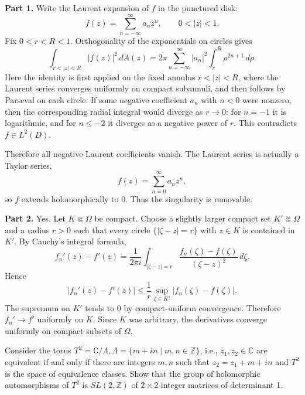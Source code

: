 \begin{solution}
\textbf{Part 1.}
Write the Laurent expansion of $f$ in the punctured disk:
\[
f(z)=\sum_{n=-\infty}^{\infty}a_n z^n,\qquad 0<|z|<1.
\]
Fix $0<r<R<1$. Orthogonality of the exponentials on circles gives
\[
\int_{r<|z|<R}|f(z)|^2\,dA(z)
=2\pi\sum_{n=-\infty}^{\infty}|a_n|^2
\int_r^R \rho^{2n+1}\,d\rho.
\]
Here the identity is first applied on the fixed annulus $r<|z|<R$, where the Laurent series converges uniformly on compact subannuli, and then follows by Parseval on each circle. If some negative coefficient $a_n$ with $n<0$ were nonzero, then the corresponding radial integral would diverge as $r\to 0$: for $n=-1$ it is logarithmic, and for $n\leq -2$ it diverges as a negative power of $r$. This contradicts $f\in L^2(D)$.

Therefore all negative Laurent coefficients vanish. The Laurent series is actually a Taylor series,
\[
f(z)=\sum_{n=0}^{\infty}a_n z^n,
\]
so $f$ extends holomorphically to $0$. Thus the singularity is removable.

\textbf{Part 2.}
Yes. Let $K\Subset\Omega$ be compact. Choose a slightly larger compact set $K'\Subset\Omega$ and a radius $r>0$ such that every circle $\{|\zeta-z|=r\}$ with $z\in K$ is contained in $K'$. By Cauchy's integral formula,
\[
f_n'(z)-f'(z)
=\frac{1}{2\pi i}\int_{|\zeta-z|=r}
\frac{f_n(\zeta)-f(\zeta)}{(\zeta-z)^2}\,d\zeta.
\]
Hence
\[
|f_n'(z)-f'(z)|
\leq \frac{1}{r}\sup_{\zeta\in K'}|f_n(\zeta)-f(\zeta)|.
\]
The supremum on $K'$ tends to $0$ by compact-uniform convergence. Therefore $f_n'\to f'$ uniformly on $K$. Since $K$ was arbitrary, the derivatives converge uniformly on compact subsets of $\Omega$.
\end{solution}

\begin{exercise}
\label{analysis:2016:10}
Consider the torus $T^2 = \mathbb{C} / \Lambda, \Lambda = \{ m + in \mid m, n \in \mathbb{Z} \}$, i.e., $z_1, z_2 \in \mathbb{C}$ are equivalent if and only if there are integers $m, n$ such that $z_2 = z_1 + m + in$ and $T^2$ is the space of equivalence classes. Show that the group of holomorphic automorphisms of $T^2$ is $SL(2, \mathbb{Z})$ of $2 \times 2$ integer matrices of determinant 1.
\end{exercise}

